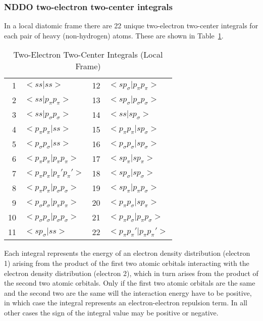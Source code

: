 \subsubsection{NDDO two-electron two-center integrals}

 In a local diatomic frame there are 22 unique
two-electron two-center integrals for each pair of heavy
(non-hydrogen) atoms. These are shown in Table~\ref{2e2c}.

\begin{table}
\caption{\label{2e2c} Two-Electron Two-Center Integrals (Local Frame)}
\begin{center}
\begin{tabular}{rlcl}
1&$<ss|ss>$&                                   12&$ <sp_{\sigma} |p_{\pi} p_{\pi} >  $\\
2&$<ss|p_{\pi}p_{\pi} >$&                      13&$ <sp_{\sigma} |p_{\sigma} p_{\sigma}>  $\\
3&$<ss|p_{\sigma} p_{\sigma} >$&               14&$ <ss|sp_{\sigma} >  $\\
4&$<p_{\pi} p_{\pi} |ss>$&                     15&$ <p_{\pi} p_{\pi} |sp_{\sigma} >  $\\
5&$<p_{\sigma} p_{\sigma} |ss>$&               16&$ <p_{\sigma} p_{\sigma} |sp_{\sigma} >  $\\
6&$<p_{\pi} p_{\pi} |p_{\pi} p_{\pi} >$&       17&$ <sp_{\pi} |sp_{\pi} >  $\\
7&$<p_{\pi} p_{\pi} |p_{\pi} 'p_{\pi} '>$&     18&$ <sp_{\sigma} |sp_{\sigma} >  $\\
8&$<p_{\pi} p_{\pi} |p_{\sigma} p_{\sigma} >$& 19&$ <sp_{\pi} |p_{\pi} p_{\sigma} >  $\\
9&$<p_{\sigma} p_{\sigma} |p_{\pi} p_{\pi} >$& 20&$ <p_{\pi} p_{\sigma} |sp_{\pi} >  $\\
10&$<p_{\sigma} p_{\sigma} |p_{\sigma} p_{\sigma} >$& 21&$ <p_{\pi} p_{\sigma} |p_{\pi} p_{\sigma} >  $\\
11&$<sp_{\sigma} |ss>$ &                        22&$ <p_{\pi} p_{\pi} '|p_{\pi} p_{\pi} '>  $
\end{tabular}
\end{center}
\end{table}
 Each integral represents the energy of an electron
density distribution (electron 1) arising from the product
of the first two atomic orbitals interacting with the
electron density distribution (electron 2), which in turn arises
from the product of the second two atomic orbitals. Only if
the first two atomic orbitals are the same and the second two
are the same will the interaction energy have to be
positive, in which case the integral represents an
electron-electron repulsion term. In all other cases the
sign of the integral value may be positive or negative.

